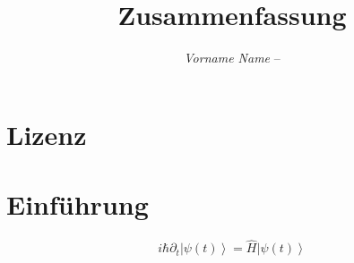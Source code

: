 \documentclass[margin=normal]{tex/hsrzf}
\author{\textsl{Vorname Name} -- \texttt{\theauthoremail}}
\title{\texttt{\themodule} Zusammenfassung}
\date{\thesemester}
\begin{document}

\maketitle



\section*{Lizenz}
\doclicenseThis

\tableofcontents

\clearpage
\setcounter{page}{1}

\section{Einf\"uhrung}
\[
  i\hbar \partial_t \left| \psi(t) \right\rangle 
    = \hat{H} \left| \psi(t) \right\rangle
\]
\end{document}
